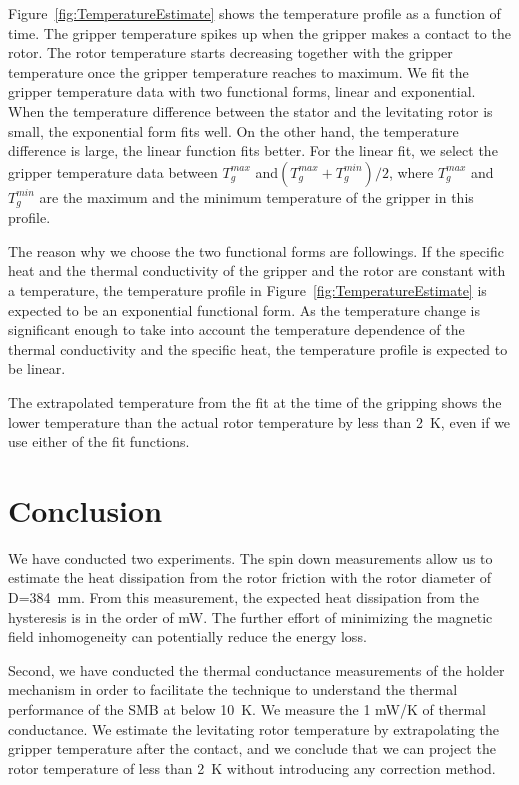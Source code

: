 \documentclass[journal]{IEEEtran}
\begin{document}
Figure~\ref{fig:TemperatureEstimate} shows the temperature profile as a function of time.
The gripper temperature spikes up when the gripper makes a contact to the rotor.
The rotor temperature starts decreasing together with the gripper temperature once the gripper temperature reaches to maximum.
We fit the gripper temperature data with two functional forms, linear and exponential.
When the temperature difference between the stator and the levitating rotor is small, the exponential form fits well.
On the other hand, the temperature difference is large, the linear function fits better.
For the linear fit, we select the gripper temperature data between $T_g^{max}$ and$(T_g^{max}+T_g^{min})/2$,
where $T_g^{max}$ and $T_g^{min}$ are the maximum and the minimum temperature of the gripper in this profile.

The reason why we choose the two functional forms are followings.
If the specific heat and the thermal conductivity of the gripper and the rotor are constant with a temperature, the temperature profile in Figure~\ref{fig:TemperatureEstimate} is expected to be an exponential functional form.
As the temperature change is significant enough to take into account the temperature dependence of the thermal conductivity and the specific heat, the temperature profile is expected to be linear.

The extrapolated temperature from the fit at the time of the gripping shows the lower temperature than the actual rotor temperature by less than 2~K, even if we use either of the fit functions.

\section{Conclusion}
We have conducted two experiments.
The spin down measurements allow us to estimate the heat dissipation from the rotor friction with the rotor diameter of D=384~mm.
From this measurement, the expected heat dissipation from the hysteresis is in the order of mW.
The further effort of minimizing the magnetic field inhomogeneity can potentially reduce the energy loss.

Second, we have conducted the thermal conductance measurements of the holder mechanism in order to facilitate the technique to understand the thermal performance of the SMB at below 10~K.
We measure the 1 mW/K of thermal conductance.
We estimate the levitating rotor temperature by extrapolating the gripper temperature after the contact, and we conclude that we can project the rotor temperature of less than 2~K without introducing any correction method.
\end{document}
